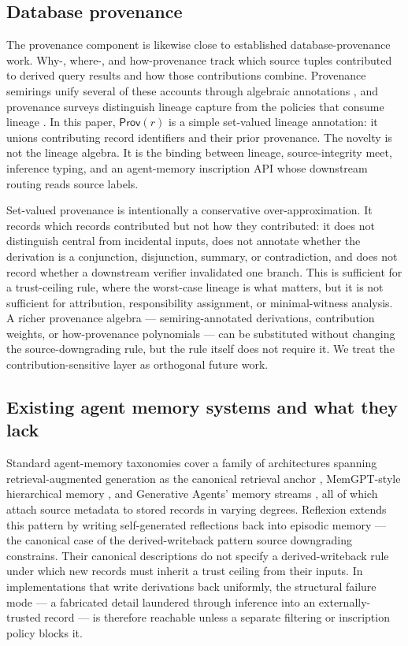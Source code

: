 \documentclass[11pt]{article}
\newcommand{\Prov}{\mathsf{Prov}}
\begin{document}
\subsection{Database provenance}

The provenance component is likewise close to established database-provenance work. Why-, where-, and how-provenance track which source tuples contributed to derived query results and how those contributions combine. Provenance semirings unify several of these accounts through algebraic annotations \cite{Green2007}, and provenance surveys distinguish lineage capture from the policies that consume lineage \cite{Cheney2009}. In this paper, $\Prov(r)$ is a simple set-valued lineage annotation: it unions contributing record identifiers and their prior provenance. The novelty is not the lineage algebra. It is the binding between lineage, source-integrity meet, inference typing, and an agent-memory inscription API whose downstream routing reads source labels.

Set-valued provenance is intentionally a conservative over-approximation. It records which records contributed but not how they contributed: it does not distinguish central from incidental inputs, does not annotate whether the derivation is a conjunction, disjunction, summary, or contradiction, and does not record whether a downstream verifier invalidated one branch. This is sufficient for a trust-ceiling rule, where the worst-case lineage is what matters, but it is not sufficient for attribution, responsibility assignment, or minimal-witness analysis. A richer provenance algebra --- semiring-annotated derivations, contribution weights, or how-provenance polynomials --- can be substituted without changing the source-downgrading rule, but the rule itself does not require it. We treat the contribution-sensitive layer as orthogonal future work.

\subsection{Existing agent memory systems and what they lack}

Standard agent-memory taxonomies \cite{Sumers2023CoALA} cover a family of architectures spanning retrieval-augmented generation as the canonical retrieval anchor \cite{Lewis2020RAG}, MemGPT-style hierarchical memory \cite{Packer2023MemGPT}, and Generative Agents' memory streams \cite{Park2023GenerativeAgents}, all of which attach source metadata to stored records in varying degrees. Reflexion \cite{Shinn2023Reflexion} extends this pattern by writing self-generated reflections back into episodic memory --- the canonical case of the derived-writeback pattern source downgrading constrains. Their canonical descriptions do not specify a derived-writeback rule under which new records must inherit a trust ceiling from their inputs. In implementations that write derivations back uniformly, the structural failure mode --- a fabricated detail laundered through inference into an externally-trusted record --- is therefore reachable unless a separate filtering or inscription policy blocks it.
\end{document}
